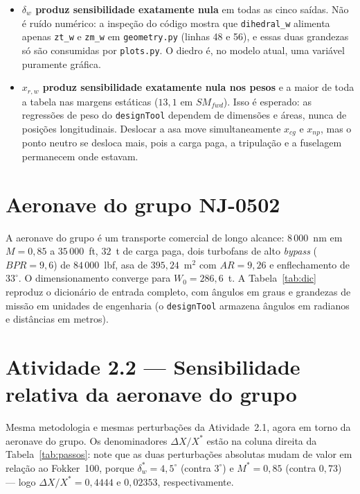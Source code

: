 \documentclass[11pt,a4paper]{article}
\newcommand{\code}[1]{\texttt{\small #1}}
\begin{document}
\begin{itemize}
\item \textbf{$\delta_w$ produz sensibilidade exatamente nula} em todas as cinco
sa\'idas. N\~ao \'e ru\'ido num\'erico: a inspe\c{c}\~ao do c\'odigo mostra que
\code{dihedral\_w} alimenta apenas \code{zt\_w} e \code{zm\_w} em
\code{geometry.py} (linhas 48 e 56), e essas duas grandezas s\'o s\~ao
consumidas por \code{plots.py}. O diedro \'e, no modelo atual, uma vari\'avel
puramente gr\'afica.

\item \textbf{$x_{r,w}$ produz sensibilidade exatamente nula nos pesos} e a
maior de toda a tabela nas margens est\'aticas ($13{,}1$ em $SM_{fwd}$). Isso
\'e esperado: as regress\~oes de peso do \code{designTool} dependem de
dimens\~oes e \'areas, nunca de posi\c{c}\~oes longitudinais. Deslocar a asa
move simultaneamente $x_{cg}$ e $x_{np}$, mas o ponto neutro se desloca mais,
pois a carga paga, a tripula\c{c}\~ao e a fuselagem permanecem onde estavam.
\end{itemize}

\section{Aeronave do grupo NJ-0502}

A aeronave do grupo \'e um transporte comercial de longo alcance:
$8\,000$~nm em $M = 0{,}85$ a $35\,000$~ft, $32$~t de carga paga, dois
turbofans de alto \emph{bypass} ($BPR = 9{,}6$) de $84\,000$~lbf, asa de
$395{,}24$~m$^2$ com $AR = 9{,}26$ e enflechamento de $33^\circ$. O
dimensionamento converge para $W_0 = 286{,}6$~t. A
Tabela~\ref{tab:dic} reproduz o dicion\'ario de entrada completo, com
\^angulos em graus e grandezas de miss\~ao em unidades de engenharia
(o \code{designTool} armazena \^angulos em radianos e dist\^ancias em metros).

{\small}

\section{Atividade 2.2 --- Sensibilidade relativa da aeronave do grupo}

Mesma metodologia e mesmas perturba\c{c}\~oes da Atividade~2.1, agora em torno
da aeronave do grupo. Os denominadores $\Delta X/X^{*}$ est\~ao na coluna
direita da Tabela~\ref{tab:passos}: note que as duas perturba\c{c}\~oes
absolutas mudam de valor em rela\c{c}\~ao ao Fokker~100, porque
$\delta_w^{*} = 4{,}5^\circ$ (contra $3^\circ$) e $M^{*} = 0{,}85$ (contra
$0{,}73$) --- logo $\Delta X/X^{*} = 0{,}4444$ e $0{,}02353$, respectivamente.
\end{document}
